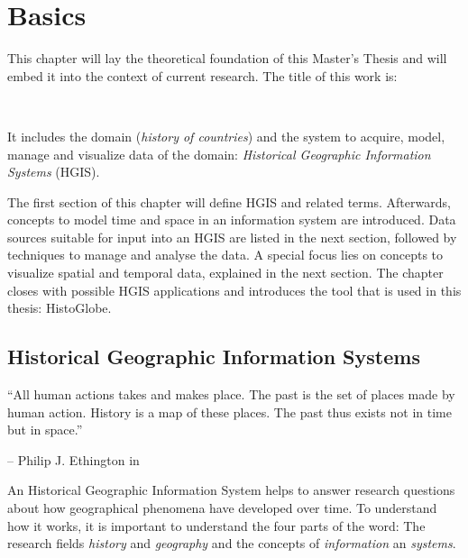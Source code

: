 

\chapter{Basics} %
\label{cha:basics}

This chapter will lay the theoretical foundation of this Master's Thesis and will embed it into the context of current research. The title of this work is:

\vspace{-1em}
\begin{center}
\textbf{\titleFirst \\ \titleSecond}
\end{center}

It includes the domain (\emph{history of countries}) and the system to acquire, model, manage and visualize data of the domain: \emph{Historical Geographic Information Systems} (HGIS).

The first section of this chapter will define HGIS and related terms. Afterwards, concepts to model time and space in an information system are introduced. Data sources suitable for input into an HGIS are listed in the next section, followed by techniques to manage and analyse the data. A special focus lies on concepts to visualize spatial and temporal data, explained in the next section. The chapter closes with possible HGIS applications and introduces the tool that is used in this thesis: HistoGlobe.


\section{Historical Geographic Information Systems} %
\label{sec:historical_geographic_information_systems}

\begin{quoteit}
  ``All human actions takes and makes place. The past is the set of places made by human action. History is a map of these places. The past thus exists not in time but in space.''
\end{quoteit}
\hfill -- Philip J. Ethington in \cite[précis]{citeTakeMakePlace}

An Historical Geographic Information System helps to answer research questions about how geographical phenomena have developed over time. To understand how it works, it is important to understand the four parts of the word: The research fields \emph{history} and \emph{geography} and the concepts of \emph{information} an \emph{systems}.


